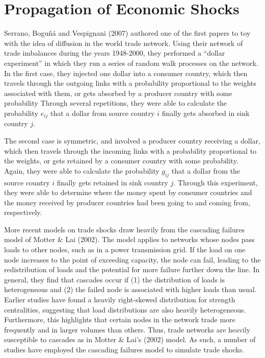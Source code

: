 \documentclass[12pt,letterpaper]{report}
\begin{document}
\section{Propagation of Economic Shocks}
\label{sec:22Shocks}
	
	Serrano, Boguñá and Vespignani (2007) authored one of the first papers to toy with the idea of diffusion in the world trade network. Using their network of trade imbalances during the years 1948-2000, they performed a ``dollar experiment'' in which they run a series of random walk processes on the network. In the first case, they injected one dollar into a consumer country, which then travels through the outgoing links with a probability proportional to the weights associated with them, or gets absorbed by a producer country with some probability Through several repetitions, they were able to calculate the probability $e_{ij}$ that a dollar from source country $i$ finally gets absorbed in sink country $j$.
	
	The second case is symmetric, and involved a producer country receiving a dollar, which then travels through the incoming links with a probability proportional to the weights, or gets retained by a consumer country with some probability. Again, they were able to calculate the probability $g_{ij}$ that a dollar from the source country $i$ finally gets retained in sink country $j$. Through this experiment, they were able to determine where the money spent by consumer countries and the money received by producer countries had been going to and coming from, respectively.
	
	More recent models on trade shocks draw heavily from the cascading failures model of Motter \& Lai (2002). The model applies to networks whose nodes pass loads to other nodes, such as in a power transmission grid. If the load on one node increases to the point of exceeding capacity, the node can fail, leading to the redistribution of loads and the potential for more failure further down the line. In general, they find that cascades occur if (1) the distribution of loads is heterogeneous and (2) the failed node is associated with higher loads than usual. Earlier studies have found a heavily right-skewed distribution for strength centralities, suggesting that load distributions are also heavily heterogeneous. Furthermore, this highlights that certain nodes in the network trade more frequently and in larger volumes than others. Thus, trade networks are heavily susceptible to cascades as in Motter \& Lai's (2002) model. As such, a number of studies have employed the cascading failures model to simulate trade shocks.
	
\end{document}
